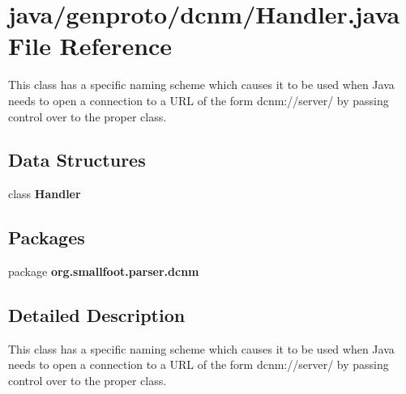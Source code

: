 \section{java/genproto/dcnm/\+Handler.java File Reference}
\label{dcnm_2Handler_8java}


This class has a specific naming scheme which causes it to be used when Java needs to open a connection to a U\+R\+L of the form dcnm\+://server/ by passing control over to the proper class.  


\subsection*{Data Structures}
\begin{DoxyCompactItemize}
\item 
class {\bf Handler}
\end{DoxyCompactItemize}
\subsection*{Packages}
\begin{DoxyCompactItemize}
\item 
package {\bf org.\+smallfoot.\+parser.\+dcnm}
\end{DoxyCompactItemize}


\subsection{Detailed Description}
This class has a specific naming scheme which causes it to be used when Java needs to open a connection to a U\+R\+L of the form dcnm\+://server/ by passing control over to the proper class. 

